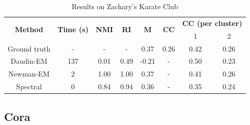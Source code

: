 \documentclass[switch, 12pt]{article}
\begin{document}
\begin{table}[h]
    \centering
    \setlength\heavyrulewidth{0.25ex}
    \begin{tabular}{@{}cccccccc@{}}
        \toprule
        \multirow{2}{*}{\textbf{Method}}  & \multirow{2}{*}{\textbf{Time (s)}} & \multirow{2}{*}{\textbf{NMI}} & \multirow{2}{*}{\textbf{RI}} & \multirow{2}{*}{\textbf{M}} & \multirow{2}{*}{\textbf{CC}} & \multicolumn{2}{c}{\textbf{CC (per cluster)}}        \\
                                          &                                    &                               &                              &                             &                              & 1                                             & 2    \\ \midrule
        \multicolumn{1}{c|}{Ground truth} & \multicolumn{1}{c|}{-}             & -                             & \multicolumn{1}{c|}{-}       & 0.37                        & 0.26                         & 0.42                                          & 0.26 \\
        \multicolumn{1}{c|}{Daudin-EM}    & \multicolumn{1}{c|}{137}           & 0.01                          & \multicolumn{1}{c|}{0.49}    & -0.21                       & -                            & 0.50                                          & 0.23 \\
        \multicolumn{1}{c|}{Newman-EM}    & \multicolumn{1}{c|}{2}             & 1.00                          & \multicolumn{1}{c|}{1.00}    & 0.37                        & -                            & 0.41                                          & 0.26 \\
        \multicolumn{1}{c|}{Spectral}     & \multicolumn{1}{c|}{0}             & 0.84                          & \multicolumn{1}{c|}{0.94}    & 0.36                        & -                            & 0.35                                          & 0.24 \\ \bottomrule
    \end{tabular}
    \caption{Results on Zachary’s Karate Club}
    \label{tab:zachary_results}
\end{table}

\newpage

\subsection{Cora}
\label{app:cora}

\hphantom{.}
\end{document}
